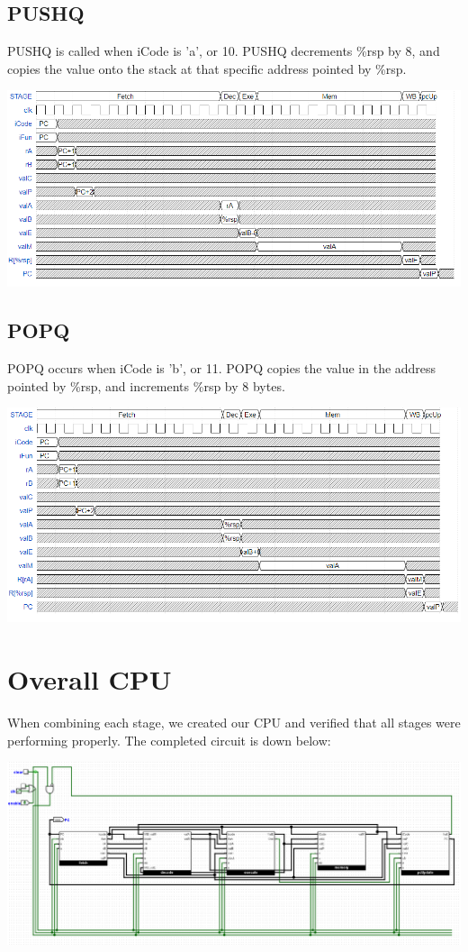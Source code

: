 \documentclass{article}
\begin{document}
\subsection{PUSHQ}
PUSHQ is called when iCode is 'a', or 10. PUSHQ decrements \%rsp by 8, and copies the value onto the stack at that specific address pointed by \%rsp. 
\begin{center}
    \includegraphics[scale=.6]{PUSHQpic.png}
\end{center}
\subsection{POPQ}
POPQ occurs when iCode is 'b', or 11. POPQ copies the value in the address pointed by \%rsp, and increments \%rsp by 8 bytes. 
\begin{center}
    \includegraphics[scale=.6]{POPQpic.png}
\end{center}
\pagebreak
\section{Overall CPU}
When combining each stage, we created our CPU and verified that all stages were performing properly. The completed circuit is down below:
\begin{center}
    \includegraphics[scale=.35]{mainCPU.png}
\end{center}
\end{document}
